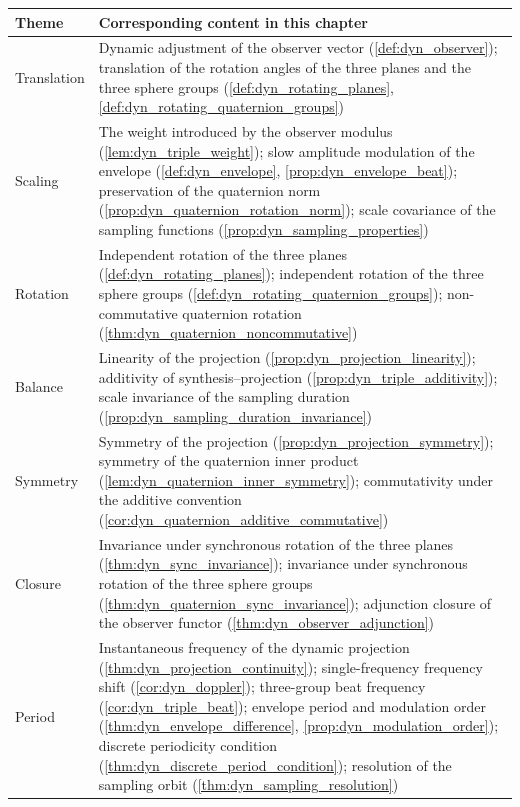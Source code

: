 \begin{center}
\renewcommand{\arraystretch}{1.3}
\begin{tabular}{@{}>{\raggedright\arraybackslash}p{2.8cm}>{\raggedright\arraybackslash}p{9.9cm}@{}}
\toprule
Theme & Corresponding content in this chapter \\
\midrule
Translation & Dynamic adjustment of the observer vector (\cref{def:dyn_observer}); translation of the rotation angles of the three planes and the three sphere groups (\cref{def:dyn_rotating_planes}, \cref{def:dyn_rotating_quaternion_groups}) \\
Scaling & The weight introduced by the observer modulus (\cref{lem:dyn_triple_weight}); slow amplitude modulation of the envelope (\cref{def:dyn_envelope}, \cref{prop:dyn_envelope_beat}); preservation of the quaternion norm (\cref{prop:dyn_quaternion_rotation_norm}); scale covariance of the sampling functions (\cref{prop:dyn_sampling_properties}) \\
Rotation & Independent rotation of the three planes (\cref{def:dyn_rotating_planes}); independent rotation of the three sphere groups (\cref{def:dyn_rotating_quaternion_groups}); non-commutative quaternion rotation (\cref{thm:dyn_quaternion_noncommutative}) \\
Balance & Linearity of the projection (\cref{prop:dyn_projection_linearity}); additivity of synthesis--projection (\cref{prop:dyn_triple_additivity}); scale invariance of the sampling duration (\cref{prop:dyn_sampling_duration_invariance}) \\
Symmetry & Symmetry of the projection (\cref{prop:dyn_projection_symmetry}); symmetry of the quaternion inner product (\cref{lem:dyn_quaternion_inner_symmetry}); commutativity under the additive convention (\cref{cor:dyn_quaternion_additive_commutative}) \\
Closure & Invariance under synchronous rotation of the three planes (\cref{thm:dyn_sync_invariance}); invariance under synchronous rotation of the three sphere groups (\cref{thm:dyn_quaternion_sync_invariance}); adjunction closure of the observer functor (\cref{thm:dyn_observer_adjunction}) \\
Period & Instantaneous frequency of the dynamic projection (\cref{thm:dyn_projection_continuity}); single-frequency frequency shift (\cref{cor:dyn_doppler}); three-group beat frequency (\cref{cor:dyn_triple_beat}); envelope period and modulation order (\cref{thm:dyn_envelope_difference}, \cref{prop:dyn_modulation_order}); discrete periodicity condition (\cref{thm:dyn_discrete_period_condition}); resolution of the sampling orbit (\cref{thm:dyn_sampling_resolution}) \\
\bottomrule
\end{tabular}
\end{center}

